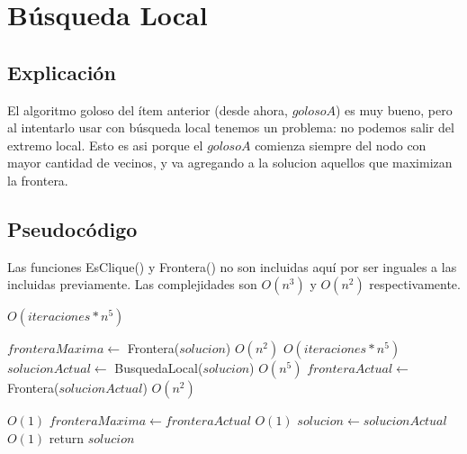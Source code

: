 \section{Búsqueda Local}

\subsection{Explicación}


El algoritmo goloso del ítem anterior (desde ahora, $goloso A$) es muy bueno, pero al intentarlo usar con búsqueda local tenemos un problema: no podemos salir del extremo local. Esto es asi porque el $goloso A$ comienza siempre del nodo con mayor cantidad de vecinos, y va agregando a la solucion aquellos que maximizan la frontera.


\subsection{Pseudocódigo}

Las funciones EsClique() y Frontera() no son incluidas aquí por ser inguales a las incluidas previamente. Las complejidades son $O(n^3)$ y $O(n^2)$ respectivamente. \\

\begin{algorithm}[H]
\begin{algorithmic}
          \Comment $O(iteraciones * n^5)$

    \State $fronteraMaxima \gets$ Frontera($solucion$)                      \Comment $O(n^2)$
                                             \Comment $O(iteraciones * n^5)$
        \State $solucionActual \gets$ BusquedaLocal($solucion$)             \Comment $O(n^5)$
        \State $fronteraActual \gets$ Frontera($solucionActual$)            \Comment $O(n^2)$

                                      \Comment $O(1)$
            \State $fronteraMaxima \gets fronteraActual$                    \Comment $O(1)$
            \State $solucion \gets solucionActual$                          \Comment $O(1)$
        \EndIf
    \EndFor
    \State return $solucion$

\EndFunction
\end{algorithmic}
\end{algorithm}

